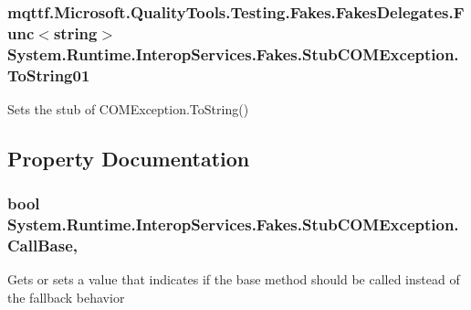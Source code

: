 \hypertarget{class_system_1_1_runtime_1_1_interop_services_1_1_fakes_1_1_stub_c_o_m_exception_a306c59cb72ced9047e1381172bae1280}{
\subsubsection[{To\-String01}]{\setlength{\rightskip}{0pt plus 5cm}mqttf.\-Microsoft.\-Quality\-Tools.\-Testing.\-Fakes.\-Fakes\-Delegates.\-Func$<$string$>$ System.\-Runtime.\-Interop\-Services.\-Fakes.\-Stub\-C\-O\-M\-Exception.\-To\-String01}}\label{class_system_1_1_runtime_1_1_interop_services_1_1_fakes_1_1_stub_c_o_m_exception_a306c59cb72ced9047e1381172bae1280}


Sets the stub of C\-O\-M\-Exception.\-To\-String()



\subsection{Property Documentation}
\hypertarget{class_system_1_1_runtime_1_1_interop_services_1_1_fakes_1_1_stub_c_o_m_exception_ac3215ef826b845ae8069c11685deee80}{
\subsubsection[{Call\-Base}]{\setlength{\rightskip}{0pt plus 5cm}bool System.\-Runtime.\-Interop\-Services.\-Fakes.\-Stub\-C\-O\-M\-Exception.\-Call\-Base\hspace{0.3cm}{\ttfamily [get]}, {\ttfamily [set]}}}\label{class_system_1_1_runtime_1_1_interop_services_1_1_fakes_1_1_stub_c_o_m_exception_ac3215ef826b845ae8069c11685deee80}


Gets or sets a value that indicates if the base method should be called instead of the fallback behavior

